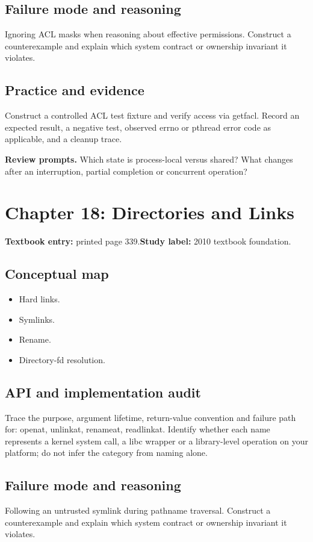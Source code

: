 \documentclass[11pt,letterpaper,oneside]{report}
\begin{document}
\subsection{Failure mode and reasoning}
Ignoring ACL masks when reasoning about effective permissions. Construct a counterexample and explain which system contract or ownership invariant it violates.

\subsection{Practice and evidence}
Construct a controlled ACL test fixture and verify access via getfacl. Record an expected result, a negative test, observed errno or pthread error code as applicable, and a cleanup trace.

\textbf{Review prompts.} Which state is process-local versus shared? What changes after an interruption, partial completion or concurrent operation?

\section{Chapter 18: Directories and Links}
\textbf{Textbook entry:} printed page 339.\quad \textbf{Study label:} 2010 textbook foundation.

\subsection{Conceptual map}
\begin{itemize}
\item Hard links.
\item Symlinks.
\item Rename.
\item Directory-fd resolution.
\end{itemize}
\subsection{API and implementation audit}
Trace the purpose, argument lifetime, return-value convention and failure path for: openat, unlinkat, renameat, readlinkat. Identify whether each name represents a kernel system call, a libc wrapper or a library-level operation on your platform; do not infer the category from naming alone.

\subsection{Failure mode and reasoning}
Following an untrusted symlink during pathname traversal. Construct a counterexample and explain which system contract or ownership invariant it violates.
\end{document}
